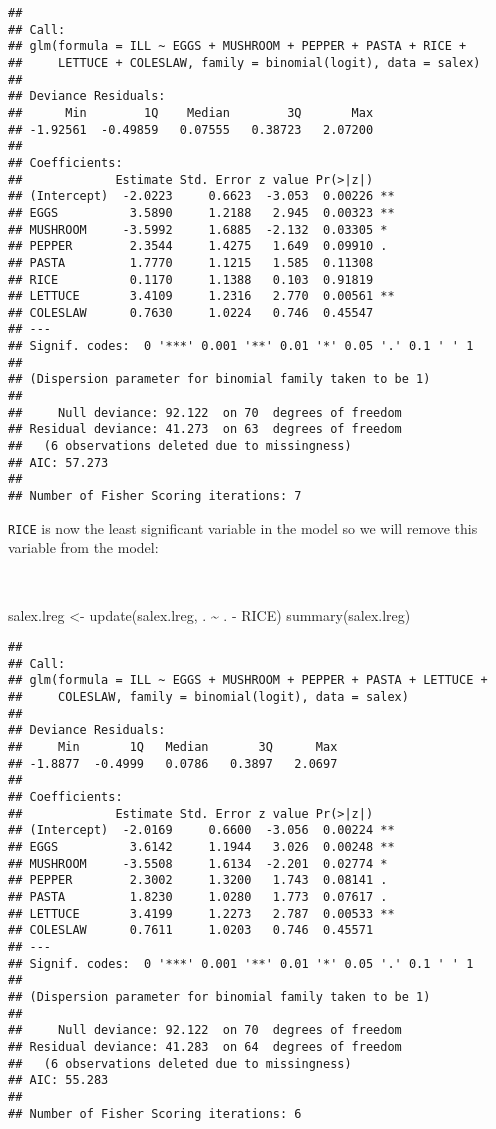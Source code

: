 \documentclass[
  12pt,
  a4paper]{book}
\newenvironment{Shaded}{\begin{snugshade}}{\end{snugshade}}
\newcommand{\FunctionTok}[1]{\textcolor[rgb]{0.00,0.00,0.00}{#1}}
\newcommand{\NormalTok}[1]{#1}
\newcommand{\OtherTok}[1]{\textcolor[rgb]{0.56,0.35,0.01}{#1}}
\newcommand{\SpecialCharTok}[1]{\textcolor[rgb]{0.00,0.00,0.00}{#1}}
\begin{document}
\begin{verbatim}
## 
## Call:
## glm(formula = ILL ~ EGGS + MUSHROOM + PEPPER + PASTA + RICE + 
##     LETTUCE + COLESLAW, family = binomial(logit), data = salex)
## 
## Deviance Residuals: 
##      Min        1Q    Median        3Q       Max  
## -1.92561  -0.49859   0.07555   0.38723   2.07200  
## 
## Coefficients:
##             Estimate Std. Error z value Pr(>|z|)   
## (Intercept)  -2.0223     0.6623  -3.053  0.00226 **
## EGGS          3.5890     1.2188   2.945  0.00323 **
## MUSHROOM     -3.5992     1.6885  -2.132  0.03305 * 
## PEPPER        2.3544     1.4275   1.649  0.09910 . 
## PASTA         1.7770     1.1215   1.585  0.11308   
## RICE          0.1170     1.1388   0.103  0.91819   
## LETTUCE       3.4109     1.2316   2.770  0.00561 **
## COLESLAW      0.7630     1.0224   0.746  0.45547   
## ---
## Signif. codes:  0 '***' 0.001 '**' 0.01 '*' 0.05 '.' 0.1 ' ' 1
## 
## (Dispersion parameter for binomial family taken to be 1)
## 
##     Null deviance: 92.122  on 70  degrees of freedom
## Residual deviance: 41.273  on 63  degrees of freedom
##   (6 observations deleted due to missingness)
## AIC: 57.273
## 
## Number of Fisher Scoring iterations: 7
\end{verbatim}

\newpage

\texttt{RICE} is now the least significant variable in the model so we will remove this variable from the model:

~

\begin{Shaded}
\begin{Highlighting}[]
\NormalTok{salex.lreg }\OtherTok{\textless{}{-}} \FunctionTok{update}\NormalTok{(salex.lreg, . }\SpecialCharTok{\textasciitilde{}}\NormalTok{ . }\SpecialCharTok{{-}}\NormalTok{ RICE)}
\FunctionTok{summary}\NormalTok{(salex.lreg)}
\end{Highlighting}
\end{Shaded}

\begin{verbatim}
## 
## Call:
## glm(formula = ILL ~ EGGS + MUSHROOM + PEPPER + PASTA + LETTUCE + 
##     COLESLAW, family = binomial(logit), data = salex)
## 
## Deviance Residuals: 
##     Min       1Q   Median       3Q      Max  
## -1.8877  -0.4999   0.0786   0.3897   2.0697  
## 
## Coefficients:
##             Estimate Std. Error z value Pr(>|z|)   
## (Intercept)  -2.0169     0.6600  -3.056  0.00224 **
## EGGS          3.6142     1.1944   3.026  0.00248 **
## MUSHROOM     -3.5508     1.6134  -2.201  0.02774 * 
## PEPPER        2.3002     1.3200   1.743  0.08141 . 
## PASTA         1.8230     1.0280   1.773  0.07617 . 
## LETTUCE       3.4199     1.2273   2.787  0.00533 **
## COLESLAW      0.7611     1.0203   0.746  0.45571   
## ---
## Signif. codes:  0 '***' 0.001 '**' 0.01 '*' 0.05 '.' 0.1 ' ' 1
## 
## (Dispersion parameter for binomial family taken to be 1)
## 
##     Null deviance: 92.122  on 70  degrees of freedom
## Residual deviance: 41.283  on 64  degrees of freedom
##   (6 observations deleted due to missingness)
## AIC: 55.283
## 
## Number of Fisher Scoring iterations: 6
\end{verbatim}
\end{document}
